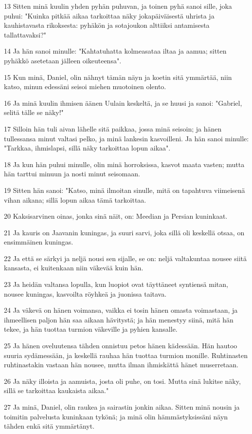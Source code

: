 \par 13 Sitten minä kuulin yhden pyhän puhuvan, ja toinen pyhä sanoi sille, joka puhui: "Kuinka pitkää aikaa tarkoittaa näky jokapäiväisestä uhrista ja kauhistavasta rikoksesta: pyhäkön ja sotajoukon alttiiksi antamisesta tallattavaksi?"
\par 14 Ja hän sanoi minulle: "Kahtatuhatta kolmeasataa iltaa ja aamua; sitten pyhäkkö asetetaan jälleen oikeuteensa".
\par 15 Kun minä, Daniel, olin nähnyt tämän näyn ja koetin sitä ymmärtää, niin katso, minun edessäni seisoi miehen muotoinen olento.
\par 16 Ja minä kuulin ihmisen äänen Uulain keskeltä, ja se huusi ja sanoi: "Gabriel, selitä tälle se näky!"
\par 17 Silloin hän tuli aivan lähelle sitä paikkaa, jossa minä seisoin; ja hänen tullessansa minut valtasi pelko, ja minä lankesin kasvoilleni. Ja hän sanoi minulle: "Tarkkaa, ihmislapsi, sillä näky tarkoittaa lopun aikaa".
\par 18 Ja kun hän puhui minulle, olin minä horroksissa, kasvot maata vasten; mutta hän tarttui minuun ja nosti minut seisomaan.
\par 19 Sitten hän sanoi: "Katso, minä ilmoitan sinulle, mitä on tapahtuva viimeisenä vihan aikana; sillä lopun aikaa tämä tarkoittaa.
\par 20 Kaksisarvinen oinas, jonka sinä näit, on: Meedian ja Persian kuninkaat.
\par 21 Ja kauris on Jaavanin kuningas, ja suuri sarvi, joka sillä oli keskellä otsaa, on ensimmäinen kuningas.
\par 22 Ja että se särkyi ja neljä nousi sen sijalle, se on: neljä valtakuntaa nousee siitä kansasta, ei kuitenkaan niin väkevää kuin hän.
\par 23 Ja heidän valtansa lopulla, kun luopiot ovat täyttäneet syntiensä mitan, nousee kuningas, kasvoilta röyhkeä ja juonissa taitava.
\par 24 Ja väkevä on hänen voimansa, vaikka ei tosin hänen omasta voimastaan, ja ihmeellisen paljon hän saa aikaan hävitystä; ja hän menestyy siinä, mitä hän tekee, ja hän tuottaa turmion väkeville ja pyhien kansalle.
\par 25 Ja hänen oveluutensa tähden onnistuu petos hänen kädessään. Hän hautoo suuria sydämessään, ja keskellä rauhaa hän tuottaa turmion monille. Ruhtinasten ruhtinastakin vastaan hän nousee, mutta ilman ihmiskättä hänet muserretaan.
\par 26 Ja näky illoista ja aamuista, josta oli puhe, on tosi. Mutta sinä lukitse näky, sillä se tarkoittaa kaukaista aikaa."
\par 27 Ja minä, Daniel, olin raukea ja sairastin jonkin aikaa. Sitten minä nousin ja toimitin palvelusta kuninkaan tykönä; ja minä olin hämmästyksissäni näyn tähden enkä sitä ymmärtänyt.

